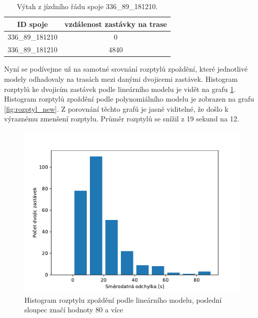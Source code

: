 \begin{center}
   \begin{table}[ht]
\centering
\begin{tabular}{|c|c|}
\hline
ID spoje & vzdálenost zastávky na trase \\ \hline \hline
336\_89\_181210 & 0 \\ \hline
336\_89\_181210 & 4840 \\ \hline
\end{tabular}
\label{tab:9270_ride}
\caption{Výtah z jízdního řádu spoje 336\_89\_181210.}
\end{table}
\end{center}


\bigbreak


Nyní se podívejme už na samotné srovnání rozptylů zpoždění, které jednotlivé modely odhadovaly na trasách mezi danými dvojicemi zastávek. Histogram rozptylů ke dvojicím zastávek podle lineárního modelu je vidět na grafu \ref{fig:rozptyl_old}. Histogram rozptylů zpoždění podle polynomiálního modelu je zobrazen na grafu \ref{fig:rozptyl_new}. Z porovnání těchto grafů je jasně viditelné, že došlo k výraznému zmenšení rozptylu. Průměr rozptylů se snížil z 19 sekund na 12.


\begin{figure}
   \centering
 \includegraphics[width=\linewidth]{../img/rozptyl_old}
 \caption{Histogram rozptylu zpoždění podle lineárního modelu, poslední sloupec značí hodnoty 80 a více}
 \label{fig:rozptyl_old}
\end{figure}


